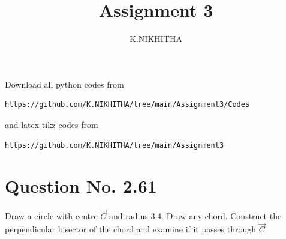 \documentclass[journal,12pt,twocolumn]{IEEEtran}
\begin{document}
     \def\rightbox#1{\makebox[0in][r]{#1}}
     \def\centbox#1{\makebox[0in]{#1}}
     \def\topbox#1{\raisebox{-\baselineskip}[0in][0in]{#1}}
     \def\midbox#1{\raisebox{-0.5\baselineskip}[0in][0in]{#1}}
\vspace{3cm}
\title{Assignment 3}
\author{K.NIKHITHA}
\maketitle
\newpage
\bigskip
\renewcommand{\thefigure}{\theenumi}
\renewcommand{\thetable}{\theenumi}
Download all python codes from 
\begin{lstlisting}
https://github.com/K.NIKHITHA/tree/main/Assignment3/Codes
\end{lstlisting}
%
and latex-tikz codes from 
%
\begin{lstlisting}
https://github.com/K.NIKHITHA/tree/main/Assignment3
\end{lstlisting}
%
\section{Question No. 2.61}
 Draw a circle with centre $\vec{C}$ and radius 3.4. Draw any chord. Construct the perpendicular bisector of the chord and examine if it passes through $\vec{C}$
%
\end{document}
